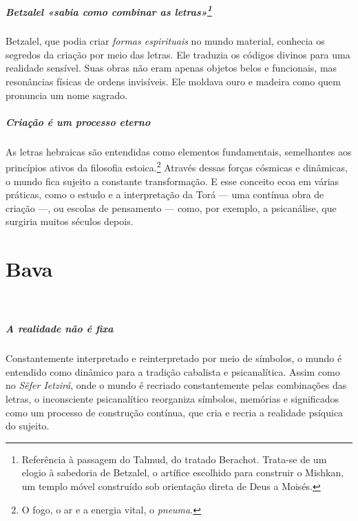 \paragraph{Betzalel «sabia como combinar as letras»\footnote{Referência à passagem do Talmud, do tratado Berachot. Trata-se de um elogio à sabedoria de Betzalel, o artífice escolhido para construir o Mishkan, um templo móvel construído sob orientação direta de Deus a Moisés.}} Betzalel, que podia criar \textit{formas espirituais} no mundo material, conhecia os segredos da criação por meio das letras. Ele traduzia os códigos divinos para uma realidade sensível. Suas obras não eram apenas objetos belos e funcionais, mas resonâncias físicas de ordens invisíveis. Ele moldava ouro e madeira como quem pronuncia um nome sagrado.

\paragraph{Criação é um processo eterno} As letras hebraicas são entendidas como elementos fundamentais, semelhantes aos princípios ativos da filosofia estoica.\footnote{O fogo, o ar e a energia vital, o \textit{pneuma}.} Através dessas forças cósmicas e dinâmicas, o mundo fica sujeito a constante transformação. E esse conceito ecoa em várias práticas, como o estudo e a interpretação da Torá --- uma contínua obra de criação ---, ou escolas de pensamento --- como, por exemplo, a psicanálise, que surgiria muitos séculos depois.

\chapter*{Bava 
\smallskip{}}

\begin{center}
{\huge{}}\\\medskip{\footnotesize\formularlight{
\lipsum[2]
}}
\end{center}

\paragraph{A realidade não é fixa} Constantemente interpretado e reinterpretado por meio de símbolos, o mundo é entendido como dinâmico para a tradição cabalista e psicanalítica. Assim como no \textit{Sêfer Ietzirá}, onde o mundo é recriado constantemente pelas combinações das letras, o inconsciente psicanalítico reorganiza símbolos, memórias e significados como um processo de construção contínua, que cria e recria a realidade psíquica do sujeito. 

